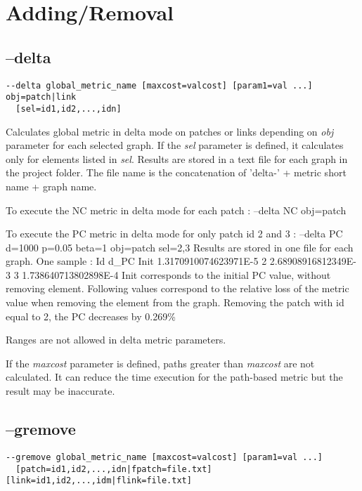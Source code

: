 \documentclass[a4paper,10pt]{report}
\newenvironment{cmd}
{\quote\Verbatim}
{\endVerbatim\endquote}
\begin{document}
\section{Adding/Removal}
\subsection{--delta}
\begin{verbatim}
--delta global_metric_name [maxcost=valcost] [param1=val ...] obj=patch|link 
  [sel=id1,id2,...,idn]
\end{verbatim}

Calculates global metric in delta mode on patches or links depending on \textit{obj} parameter for each selected graph. 
If the \textit{sel} parameter is defined, it calculates only for elements listed in \textit{sel}.
Results are stored in a text file for each graph in the project folder. The file name is the concatenation of 'delta-' + metric short name + graph name. 

To execute the NC metric in delta mode for each patch :
\begin{cmd}
--delta NC obj=patch
\end{cmd}

To execute the PC metric in delta mode for only patch id 2 and 3 :
\begin{cmd}
--delta PC d=1000 p=0.05 beta=1 obj=patch sel=2,3
\end{cmd}
Results are stored in one file for each graph. One sample :
\begin{cmd}
Id    d_PC
Init  1.3170910074623971E-5
2     2.68908916812349E-3
3     1.738640713802898E-4
\end{cmd}
Init corresponds to the initial PC value, without removing element. Following values correspond to the relative loss of the metric value when removing the element from the graph.
Removing the patch with id equal to 2, the PC decreases by 0.269\%

Ranges are not allowed in delta metric parameters.

If the \textit{maxcost} parameter is defined, paths greater than \textit{maxcost} are not calculated. It can reduce the time execution for the path-based metric but the result may be inaccurate.

\subsection{--gremove}
\begin{verbatim}
--gremove global_metric_name [maxcost=valcost] [param1=val ...] 
  [patch=id1,id2,...,idn|fpatch=file.txt] [link=id1,id2,...,idm|flink=file.txt]
\end{verbatim}
\end{document}
